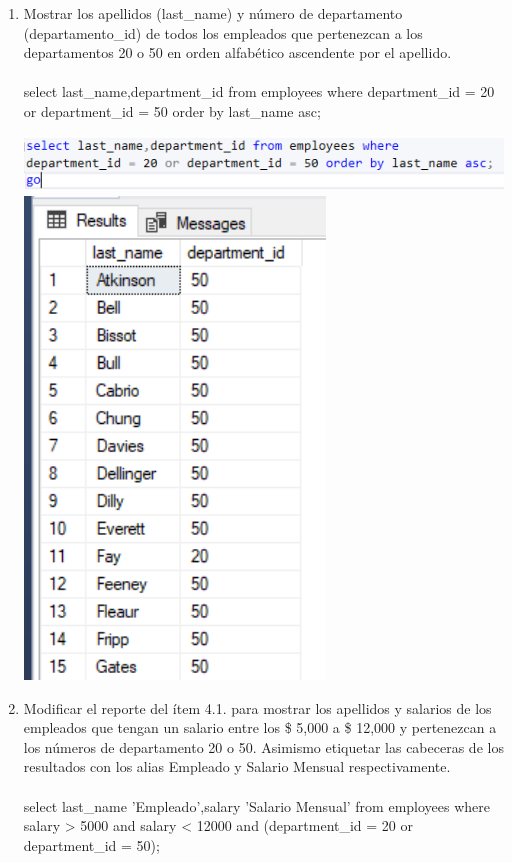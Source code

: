 \begin{enumerate}[1.]
	\item Mostrar los apellidos (last\_name) y n\'umero de departamento (departamento\_id) de todos los empleados que pertenezcan a los departamentos 20 o 50 en orden alfab\'etico ascendente por el apellido.
	\\ \\select last\_name,department\_id from employees where department\_id = 20 or department\_id = 50 order by last\_name asc;
	
	\begin{center}
	\includegraphics[width=17cm]{./Imagenes/actividad_04_05a}
	\includegraphics[width=8cm]{./Imagenes/actividad_04_05} 
	\end{center}
	
	\item Modificar el reporte del ítem 4.1. para mostrar los apellidos y salarios de los empleados que tengan un salario entre los \$ 5,000 a \$ 12,000 y pertenezcan a los números de departamento 20 o 50. Asimismo etiquetar las cabeceras de los resultados con los alias Empleado y Salario Mensual respectivamente.
	\\ \\select last\_name 'Empleado',salary 'Salario Mensual' from employees where salary > 5000 and salary < 12000 and (department\_id = 20 or department\_id = 50);


\end{enumerate}
